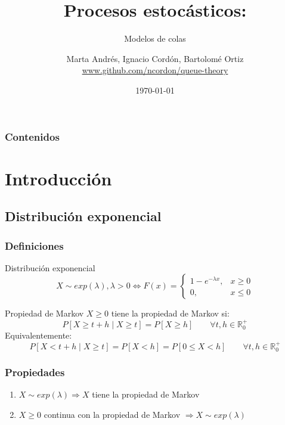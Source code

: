 \documentclass[8pt]{beamer}
\title[]{Procesos estocásticos: } %
\subtitle[]{Modelos de colas}
\author[Marta Andrés, Ignacio Cordón, Bartolomé Ortiz] %
{\texorpdfstring{
      \centering
      Marta Andrés, Ignacio Cordón, Bartolomé Ortiz\\
      \href{https://www.github.com/ncordon/queue-theory}{www.github.com/ncordon/queue-theory}
}{Marta Andrés, Ignacio Cordón, Bartolomé Ortiz}}
\institute[UGR] %
{
  Universidad de Granada \\ %
  \medskip
}
\date{\today} %
\begin{document}
\begin{frame}
\titlepage %
\end{frame}

\begin{frame}
  \frametitle{Contenidos} %
  \tableofcontents
\end{frame}




  \section{Introducción}
  \subsection{Distribución exponencial}
  \begin{frame}\frametitle{Definiciones}
    \begin{block}{Distribución exponencial}
      \[X \sim exp(\lambda),\lambda > 0 \Leftrightarrow F(x) = \left\{\begin{array}{ll}
      1- e^{-\lambda x} ,& x\ge 0 \\
      0 ,& x\le 0
      \end{array}\right.\]
    \end{block}

    \begin{block}{Propiedad de Markov}
      $X \ge 0$ tiene la propiedad de Markov si:
      \[P[X \ge t+h \mid X \ge t] = P[X \ge h] \qquad \forall t,h \in \mathbb{R}_0^{+}\]
      Equivalentemente:
      \[P[X < t+h \mid X \ge t] = P[X < h] = P[ 0 \le X < h] \qquad \forall t,h \in \mathbb{R}_0^{+}\]
    \end{block}
  \end{frame}
  \begin{frame}\frametitle{Propiedades}
    \begin{enumerate}
    \item
      $X \sim exp(\lambda) \Rightarrow X$ tiene la propiedad de Markov
    \item
      $X\ge 0$ continua con la propiedad de Markov $\Rightarrow X \sim exp(\lambda)$
    \end{enumerate}
  \end{frame}
\end{document}
